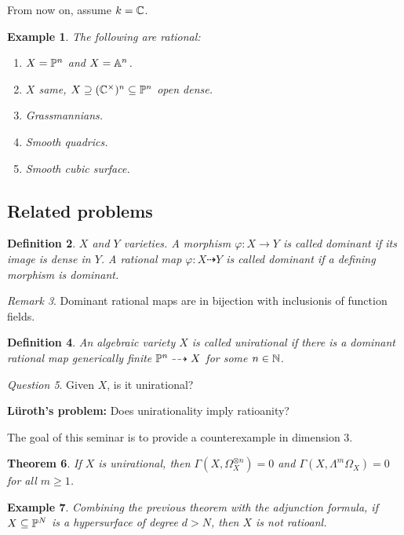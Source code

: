 \documentclass[A4paper, british, reqno]{amsart}
\theoremstyle{darkgreentheorem}
\newtheorem{thm}{Theorem}[section]
\theoremstyle{darkbluedefinition}
\newtheorem{defn}[thm]{Definition}
\theoremstyle{darkredexample}
\newtheorem{exa}[thm]{Example}
\theoremstyle{remark}
\newtheorem{rem}[thm]{Remark}
\newtheorem{q}[thm]{Question}
\newcommand{\1}{\mathbbm{1}}
\newcommand{\ot}{\otimes}
\newcommand{\sub}{\subseteq}
\begin{document}
From now on, assume $k=\C$.

\begin{exa}
    The following are rational:
    \begin{enumerate}
	\item $X=\P^{n}$ and $X=\A^{n}$.
	\item $X$ same, $X\supseteq (\C^{\times})^{n}\sub \P^{n}$ open dense.
	\item Grassmannians.
	\item Smooth quadrics.
	\item Smooth cubic surface.
    \end{enumerate}
\end{exa}

\subsection{Related problems}

\begin{defn}
    $X$ and $Y$ varieties.
    A morphism $\varphi\colon X\to Y$ is called \textit{dominant} if its image is dense in $Y$.
    A rational map $\varphi\colon X\dashrightarrow Y$ is called dominant if a defining morphism is dominant.
\end{defn}

\begin{rem}
    Dominant rational maps are in bijection with inclusionis of function fields.
\end{rem}

\begin{defn}
    An algebraic variety $X$ is called \textit{unirational} if there is a dominant rational map generically finite $\P^{n}\dashrightarrow X$ for some $n\in \N$.
\end{defn}

\begin{q}
    Given $X$, is it unirational?
\end{q}

\textbf{Lüroth's problem:}
Does unirationality imply ratioanity?

The goal of this seminar is to provide a counterexample in dimension $3$.

\begin{thm}
    If $X$ is unirational, then $\Gamma(X,\Omega_{X}^{\ot n})=0$ and $\Gamma(X,\Lambda^{m}\Omega_{X})=0$ for all $m\geqslant 1$.\end{thm}

\begin{exa}
    Combining the previous theorem with the adjunction formula, if $X\sub \P^{N}$ is a hypersurface of degree $d>N$, then $X$ is not ratioanl.
\end{exa}
\end{document}
